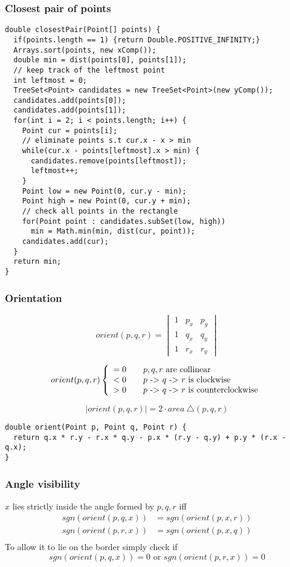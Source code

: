\subsubsection{Closest pair of points}
\begin{lstlisting}
double closestPair(Point[] points) {
  if(points.length == 1) {return Double.POSITIVE_INFINITY;}
  Arrays.sort(points, new xComp());
  double min = dist(points[0], points[1]);
  // keep track of the leftmost point
  int leftmost = 0;
  TreeSet<Point> candidates = new TreeSet<Point>(new yComp());
  candidates.add(points[0]);
  candidates.add(points[1]);
  for(int i = 2; i < points.length; i++) {
    Point cur = points[i];
    // eliminate points s.t cur.x - x > min 
    while(cur.x - points[leftmost].x > min) {
      candidates.remove(points[leftmost]);
      leftmost++;
    }
    Point low = new Point(0, cur.y - min);
    Point high = new Point(0, cur.y + min);
    // check all points in the rectangle
    for(Point point : candidates.subSet(low, high))
      min = Math.min(min, dist(cur, point));
    candidates.add(cur);
  }
  return min;
}
\end{lstlisting}
\subsubsection{Orientation}
$$
orient(p, q, r) = 
\begin{vmatrix}
1 & p_x & p_y \\
1 & q_x & q_y \\
1 & r_x & r_y
\end{vmatrix}
$$

$$
orient(p, q, r) \left\{
\begin{array}{l l l}
= 0 \quad & \text{$p, q, r$ are collinear} \\
< 0 \quad & \text{$p$ -> $q$ -> $r$ is clockwise} \\
> 0 \quad & \text{$p$ -> $q$ -> $r$ is counterclockwise}
\end{array} \right.
$$

$$
|orient(p, q, r)| = 2 \cdot area \ \triangle(p, q, r)
$$

\begin{lstlisting}
double orient(Point p, Point q, Point r) {
  return q.x * r.y - r.x * q.y - p.x * (r.y - q.y) + p.y * (r.x - q.x);
}
\end{lstlisting}
\subsubsection{Angle visibility}
$x$ lies strictly inside the angle formed by $p, q, r$ iff
\begin{align*}
sgn(orient(p, q, x)) & = sgn(orient(p, x, r)) \\
sgn(orient(p, r, x)) & = sgn(orient(p, x, q)) \\
\end{align*}
To allow it to lie on the border simply check if $$sgn(orient(p, q, x)) = 0 \text{ or } sgn(orient(p, r, x)) = 0$$
